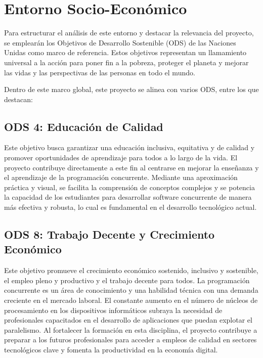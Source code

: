 \section{Entorno Socio-Económico}\label{sec:entorno-socio-economico}

Para estructurar el análisis de este entorno y destacar la relevancia del proyecto, se emplearán los Objetivos de Desarrollo Sostenible (ODS) de las Naciones Unidas \cite{ods} como marco de referencia. Estos objetivos representan un llamamiento universal a la acción para poner fin a la pobreza, proteger el planeta y mejorar las vidas y las perspectivas de las personas en todo el mundo.

Dentro de este marco global, este proyecto se alinea con varios ODS, entre los que destacan:

\subsection*{ODS 4: Educación de Calidad \cite{ods_4}}
Este objetivo busca garantizar una educación inclusiva, equitativa y de calidad y promover oportunidades de aprendizaje para todos a lo largo de la vida. El proyecto contribuye directamente a este fin al centrarse en mejorar la enseñanza y el aprendizaje de la programación concurrente. Mediante una aproximación práctica y visual, se facilita la comprensión de conceptos complejos y se potencia la capacidad de los estudiantes para desarrollar software concurrente de manera más efectiva y robusta, lo cual es fundamental en el desarrollo tecnológico actual.

\subsection*{ODS 8: Trabajo Decente y Crecimiento Económico \cite{ods_8}}
Este objetivo promueve el crecimiento económico sostenido, inclusivo y sostenible, el empleo pleno y productivo y el trabajo decente para todos. La programación concurrente es un área de conocimiento y una habilidad técnica con una demanda creciente en el mercado laboral. El constante aumento en el número de núcleos de procesamiento en los dispositivos informáticos subraya la necesidad de profesionales capacitados en el desarrollo de aplicaciones que puedan explotar el paralelismo. Al fortalecer la formación en esta disciplina, el proyecto contribuye a preparar a los futuros profesionales para acceder a empleos de calidad en sectores tecnológicos clave y fomenta la productividad en la economía digital.

